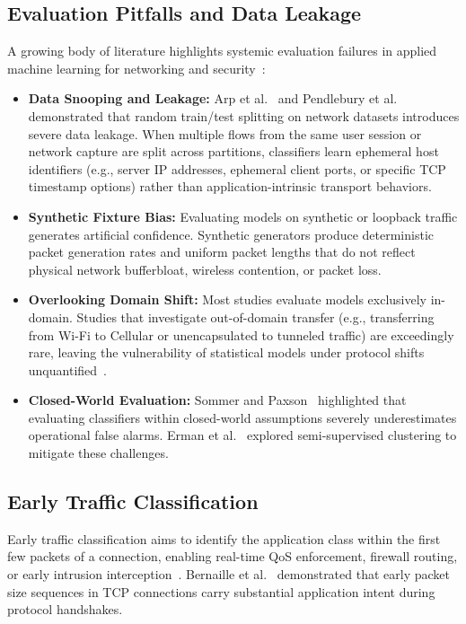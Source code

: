 \documentclass[conference]{IEEEtran}
\begin{document}
\subsection{Evaluation Pitfalls and Data Leakage}
A growing body of literature highlights systemic evaluation failures in applied machine learning for networking and security~\cite{arp2022dos,pendlebury2019tesseract,sommer2010outside,holland2021new}:
\begin{itemize}
    \item \textbf{Data Snooping and Leakage:} Arp et al.~\cite{arp2022dos} and Pendlebury et al.~\cite{pendlebury2019tesseract} demonstrated that random train/test splitting on network datasets introduces severe data leakage. When multiple flows from the same user session or network capture are split across partitions, classifiers learn ephemeral host identifiers (e.g., server IP addresses, ephemeral client ports, or specific TCP timestamp options) rather than application-intrinsic transport behaviors.
    \item \textbf{Synthetic Fixture Bias:} Evaluating models on synthetic or loopback traffic generates artificial confidence. Synthetic generators produce deterministic packet generation rates and uniform packet lengths that do not reflect physical network bufferbloat, wireless contention, or packet loss.
    \item \textbf{Overlooking Domain Shift:} Most studies evaluate models exclusively in-domain. Studies that investigate out-of-domain transfer (e.g., transferring from Wi-Fi to Cellular or unencapsulated to tunneled traffic) are exceedingly rare, leaving the vulnerability of statistical models under protocol shifts unquantified~\cite{dusi2009tunnel,drapergil2016characterization}.
    \item \textbf{Closed-World Evaluation:} Sommer and Paxson~\cite{sommer2010outside} highlighted that evaluating classifiers within closed-world assumptions severely underestimates operational false alarms. Erman et al.~\cite{erman2006traffic} explored semi-supervised clustering to mitigate these challenges.
\end{itemize}

\subsection{Early Traffic Classification}
Early traffic classification aims to identify the application class within the first few packets of a connection, enabling real-time QoS enforcement, firewall routing, or early intrusion interception~\cite{bernaille2006traffic,bernaille2007early}. Bernaille et al.~\cite{bernaille2006traffic,bernaille2007early} demonstrated that early packet size sequences in TCP connections carry substantial application intent during protocol handshakes.
\end{document}
